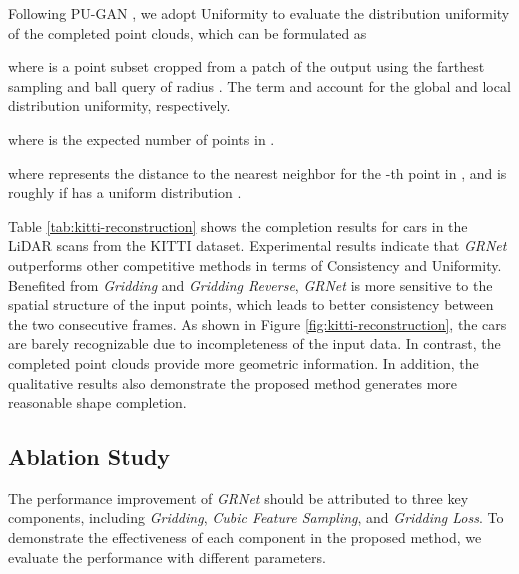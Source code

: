 \documentclass[runningheads]{llncs}
\begin{document}
Following PU-GAN \cite{DBLP:conf/iccv/LiLFCH19}, we adopt Uniformity to evaluate the distribution uniformity of the completed point clouds, which can be formulated as

where  is a point subset cropped from a patch of the output  using the farthest sampling and ball query of radius .
The term  and  account for the global and local distribution uniformity, respectively.

where  is the expected number of points in .

where  represents the distance to the nearest neighbor for the -th point in , and  is roughly  if  has a uniform distribution \cite{DBLP:conf/iccv/LiLFCH19}.

Table \ref{tab:kitti-reconstruction} shows the completion results for cars in the LiDAR scans from the KITTI dataset.
Experimental results indicate that {\it GRNet} outperforms other competitive methods in terms of Consistency and Uniformity.
Benefited from {\it Gridding} and {\it Gridding Reverse}, {\it GRNet} is more sensitive to the spatial structure of the input points, which leads to better consistency between the two consecutive frames.
As shown in Figure \ref{fig:kitti-reconstruction}, the cars are barely recognizable due to incompleteness of the input data.
In contrast, the completed point clouds provide more geometric information.
In addition, the qualitative results also demonstrate the proposed method generates more reasonable shape completion.

\subsection{Ablation Study}

The performance improvement of {\it GRNet} should be attributed to three key components, including {\it Gridding}, {\it Cubic Feature Sampling}, and {\it Gridding Loss}.
To demonstrate the effectiveness of each component in the proposed method, we evaluate the performance with different parameters.
\end{document}
